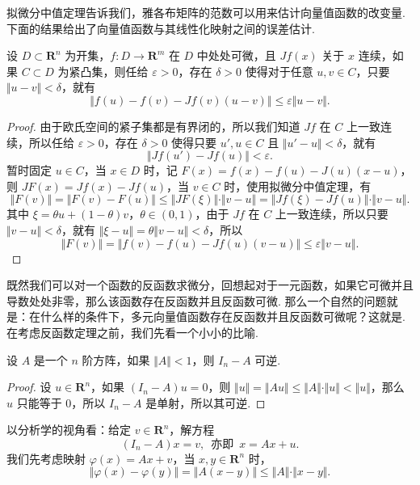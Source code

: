 拟微分中值定理告诉我们，雅各布矩阵的范数可以用来估计向量值函数的改变量. 下面的结果给出了向量值函数与其线性化映射之间的误差估计.

\begin{corollary}{}{}
    设 $D\subset \mathbf{R}^n$ 为开集，$f: D\to \mathbf{R}^m$ 在 $D$ 中处处可微，且 $Jf(x)$ 关于 $x$ 连续，如果 $C\subset D$ 为紧凸集，则任给 $\varepsilon>0$，存在 $\delta>0$ 使得对于任意 $u, v\in C$，只要 $\Vert u-v\Vert < \delta$，就有\[\Vert f(u) - f(v) - Jf(v)(u-v)\Vert \leqslant \varepsilon\Vert u-v\Vert.\]
\end{corollary}

\begin{proof}
    由于欧氏空间的紧子集都是有界闭的，所以我们知道 $Jf$ 在 $C$ 上一致连续，所以任给 $\varepsilon>0$，存在 $\delta>0$ 使得只要 $u',u\in C$ 且 $\Vert u'-u\Vert < \delta$，就有\[\Vert Jf(u') - Jf(u)\Vert < \varepsilon.\]
    暂时固定 $u\in C$，当 $x\in D$ 时，记 $F(x) = f(x) - f(u) - J(u)(x - u)$，则 $JF(x) = Jf(x) - Jf(u)$，当 $v\in C$ 时，使用拟微分中值定理，有
    \[\Vert F(v)\Vert = \Vert F(v) - F(u)\Vert \leqslant \Vert JF(\xi)\Vert\cdot \Vert v - u\Vert = \Vert Jf(\xi) - Jf(u)\Vert\cdot \Vert v - u\Vert.\]
    其中 $\xi = \theta u + (1-\theta)v$，$\theta\in (0, 1)$，由于 $Jf$ 在 $C$ 上一致连续，所以只要 $\Vert v - u\Vert < \delta$，就有 $\Vert \xi - u\Vert = \theta \Vert v - u\Vert < \delta$，所以\[\Vert F(v)\Vert = \Vert f(v) - f(u) - Jf(u)(v - u)\Vert \leqslant \varepsilon\Vert v - u\Vert.\]
\end{proof}

既然我们可以对一个函数的反函数求微分，回想起对于一元函数，如果它可微并且导数处处非零，那么该函数存在反函数并且反函数可微. 那么一个自然的问题就是：在什么样的条件下，多元向量值函数存在反函数并且反函数可微呢？这就是. 在考虑反函数定理之前，我们先看一个小小的比喻.

\begin{example}{}{}
    设 $A$ 是一个 $n$ 阶方阵，如果 $\Vert A\Vert < 1$，则 $I_n - A$ 可逆.
\end{example}

\begin{proof}
    设 $u\in \mathbf{R}^n$，如果 $(I_n - A)u = 0$，则 $\Vert u\Vert = \Vert Au\Vert \leqslant \Vert A\Vert \cdot \Vert u\Vert < \Vert u\Vert$，那么 $u$ 只能等于 $0$，所以 $I_n - A$ 是单射，所以其可逆.
\end{proof}

以分析学的视角看：给定 $v\in \mathbf{R}^n$，解方程 \[(I_n - A)x = v,\enspace\text{亦即}\enspace x = Ax+u.\]
我们先考虑映射 $\varphi(x) = Ax+v$，当 $x,y\in \mathbf{R}^n$ 时，\[\Vert \varphi(x) - \varphi(y)\Vert = \Vert A(x - y)\Vert\leqslant \Vert A\Vert\cdot \Vert x - y\Vert.\]

